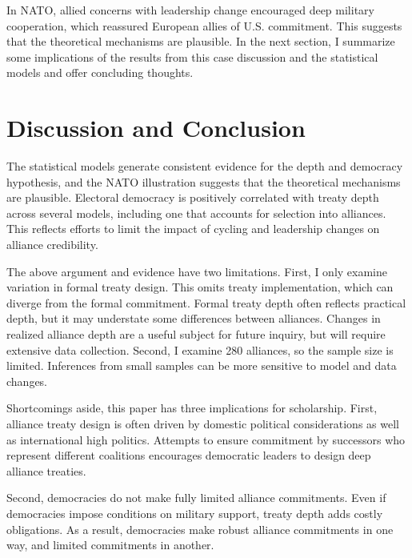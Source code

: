 \documentclass[12pt]{article}
\begin{document}


In NATO, allied concerns with leadership change encouraged deep military cooperation, which reassured European allies of U.S. commitment. 
This suggests that the theoretical mechanisms are plausible. 
In the next section, I summarize some implications of the results from this case discussion and the statistical models and offer concluding thoughts. 



\section{Discussion and Conclusion} 


The statistical models generate consistent evidence for the depth and democracy hypothesis, and the NATO illustration suggests that the theoretical mechanisms are plausible. 
Electoral democracy is positively correlated with treaty depth across several models, including one that accounts for selection into alliances. 
This reflects efforts to limit the impact of cycling and leadership changes on alliance credibility. 


The above argument and evidence have two limitations.
First, I only examine variation in formal treaty design. 
This omits treaty implementation, which can diverge from the formal commitment.   
Formal treaty depth often reflects practical depth, but it may understate some differences between alliances. 
Changes in realized alliance depth are a useful subject for future inquiry, but will require extensive data collection.
Second, I examine 280 alliances, so the sample size is limited. 
Inferences from small samples can be more sensitive to model and data changes. 


Shortcomings aside, this paper has three implications for scholarship. 
First, alliance treaty design is often driven by domestic political considerations as well as international high politics. 
Attempts to ensure commitment by successors who represent different coalitions encourages democratic leaders to design deep alliance treaties. 

Second, democracies do not make fully limited alliance commitments.
Even if democracies impose conditions on military support, treaty depth adds costly obligations.
As a result, democracies make robust alliance commitments in one way, and limited commitments in another. 
\end{document}
